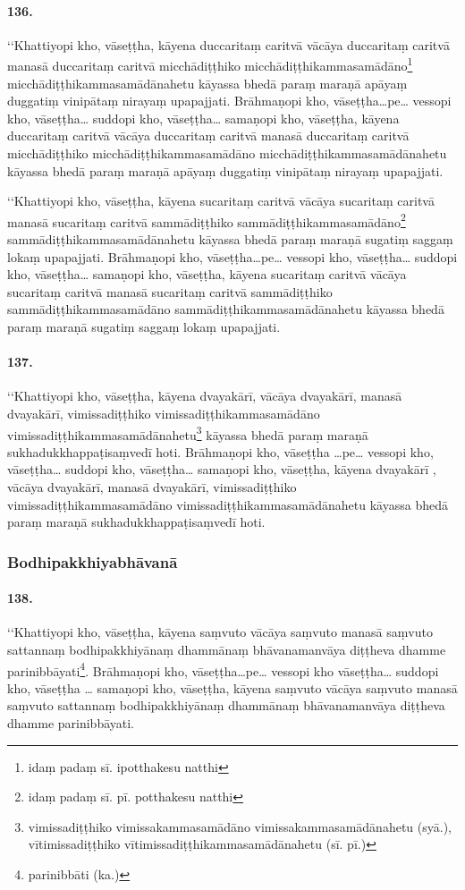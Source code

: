 \paragraph{136.} ‘‘Khattiyopi kho, vāseṭṭha, kāyena duccaritaṃ caritvā vācāya duccaritaṃ caritvā manasā duccaritaṃ caritvā micchādiṭṭhiko micchādiṭṭhikammasamādāno\footnote{idaṃ padaṃ sī. ipotthakesu natthi} micchādiṭṭhikammasamādānahetu kāyassa bhedā paraṃ maraṇā apāyaṃ duggatiṃ vinipātaṃ nirayaṃ upapajjati. Brāhmaṇopi kho, vāseṭṭha…pe… vessopi kho, vāseṭṭha… suddopi kho, vāseṭṭha… samaṇopi kho, vāseṭṭha, kāyena duccaritaṃ caritvā vācāya duccaritaṃ caritvā manasā duccaritaṃ caritvā micchādiṭṭhiko micchādiṭṭhikammasamādāno micchādiṭṭhikammasamādānahetu kāyassa bhedā paraṃ maraṇā apāyaṃ duggatiṃ vinipātaṃ nirayaṃ upapajjati.

‘‘Khattiyopi kho, vāseṭṭha, kāyena sucaritaṃ caritvā vācāya sucaritaṃ caritvā manasā sucaritaṃ caritvā sammādiṭṭhiko sammādiṭṭhikammasamādāno\footnote{idaṃ padaṃ sī. pī. potthakesu natthi} sammādiṭṭhikammasamādānahetu kāyassa bhedā paraṃ maraṇā sugatiṃ saggaṃ lokaṃ upapajjati. Brāhmaṇopi kho, vāseṭṭha…pe… vessopi kho, vāseṭṭha… suddopi kho, vāseṭṭha… samaṇopi kho, vāseṭṭha, kāyena sucaritaṃ caritvā vācāya sucaritaṃ caritvā manasā sucaritaṃ caritvā sammādiṭṭhiko sammādiṭṭhikammasamādāno sammādiṭṭhikammasamādānahetu kāyassa bhedā paraṃ maraṇā sugatiṃ saggaṃ lokaṃ upapajjati.

\paragraph{137.} ‘‘Khattiyopi kho, vāseṭṭha, kāyena dvayakārī, vācāya dvayakārī, manasā dvayakārī, vimissadiṭṭhiko vimissadiṭṭhikammasamādāno vimissadiṭṭhikammasamādānahetu\footnote{vimissadiṭṭhiko vimissakammasamādāno vimissakammasamādānahetu (syā.), vītimissadiṭṭhiko vītimissadiṭṭhikammasamādānahetu (sī. pī.)} kāyassa bhedā paraṃ maraṇā sukhadukkhappaṭisaṃvedī hoti. Brāhmaṇopi kho, vāseṭṭha …pe… vessopi kho, vāseṭṭha… suddopi kho, vāseṭṭha… samaṇopi kho, vāseṭṭha, kāyena dvayakārī , vācāya dvayakārī, manasā dvayakārī, vimissadiṭṭhiko vimissadiṭṭhikammasamādāno vimissadiṭṭhikammasamādānahetu kāyassa bhedā paraṃ maraṇā sukhadukkhappaṭisaṃvedī hoti.

\subsubsection{Bodhipakkhiyabhāvanā}

\paragraph{138.} ‘‘Khattiyopi kho, vāseṭṭha, kāyena saṃvuto vācāya saṃvuto manasā saṃvuto sattannaṃ bodhipakkhiyānaṃ dhammānaṃ bhāvanamanvāya diṭṭheva dhamme parinibbāyati\footnote{parinibbāti (ka.)}. Brāhmaṇopi kho, vāseṭṭha…pe… vessopi kho vāseṭṭha… suddopi kho, vāseṭṭha … samaṇopi kho, vāseṭṭha, kāyena saṃvuto vācāya saṃvuto manasā saṃvuto sattannaṃ bodhipakkhiyānaṃ dhammānaṃ bhāvanamanvāya diṭṭheva dhamme parinibbāyati.

